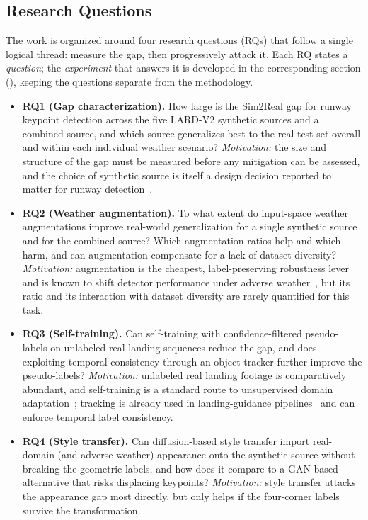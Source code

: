 \subsection{Research Questions}
\label{subsec:research-questions}
The work is organized around four research questions (RQs) that follow a single
logical thread: measure the gap, then progressively attack it. Each RQ states a
\emph{question}; the \emph{experiment} that answers it is developed in the
corresponding section (),
keeping the questions separate from the methodology.
\begin{itemize}
    \item \textbf{RQ1 (Gap characterization).} How large is the Sim2Real gap for
    runway keypoint detection across the five LARD-V2 synthetic sources and a
    combined source, and which source generalizes best to the real test set
    overall and within each individual weather scenario? \emph{Motivation:} the size
    and structure of the gap must be measured before any mitigation can be assessed,
    and the choice of synthetic source is itself a design decision reported to matter
    for runway detection~\cite{syntheticrunway2025}.
    \item \textbf{RQ2 (Weather augmentation).} To what extent do input-space
    weather augmentations improve real-world generalization for a single synthetic
    source and for the combined source? Which augmentation ratios help and which
    harm, and can augmentation compensate for a lack of dataset diversity?
    \emph{Motivation:} augmentation is the cheapest, label-preserving robustness
    lever and is known to shift detector performance under adverse
    weather~\cite{weatherrobust2025}, but its ratio and its interaction with dataset
    diversity are rarely quantified for this task.
    \item \textbf{RQ3 (Self-training).} Can self-training with confidence-filtered
    pseudo-labels on unlabeled real landing sequences reduce the gap, and does
    exploiting temporal consistency through an object tracker further improve the
    pseudo-labels? \emph{Motivation:} unlabeled real landing footage is comparatively
    abundant, and self-training is a standard route to unsupervised domain
    adaptation~\cite{ganin2015dann}; tracking is already used in landing-guidance
    pipelines~\cite{ferreira2025landing, runwaysurveillance2026} and can enforce
    temporal label consistency.
    \item \textbf{RQ4 (Style transfer).} Can diffusion-based style transfer import
    real-domain (and adverse-weather) appearance onto the synthetic source without
    breaking the geometric labels, and how does it compare to a GAN-based
    alternative that risks displacing keypoints? \emph{Motivation:} style transfer
    attacks the appearance gap most directly, but only helps if the four-corner
    labels survive the transformation.
\end{itemize}

